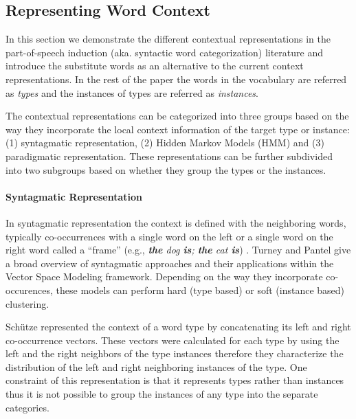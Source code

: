 \subsection{Representing Word Context}
\label{sec:representation}


In this section we demonstrate the different contextual representations in the
part-of-speech induction (aka. syntactic word categorization) literature and
introduce the substitute words as an alternative to the current context
representations.  In the rest of the paper the words in the vocabulary are
referred as {\em types} and the instances of types are referred as {\em
instances}.

The contextual representations can be categorized into three groups
based on the way they incorporate the local context information of the
target type or instance: (1) syntagmatic representation, (2) Hidden
Markov Models (HMM) and (3) paradigmatic representation.  These
representations can be further subdivided into two subgroups based on
whether they group the types or the instances.

\paragraph{Syntagmatic Representation}

In syntagmatic representation the context is defined with the
neighboring words, typically co-occurrences with a single word on the
left or a single word on the right word called a ``frame'' (e.g., {\em
  {\bf the} dog {\bf is}; {\bf the} cat {\bf is}})
\cite{SchutzePe93,redington1998distributional,mintz2003frequent,20674613,lamar-EtAl:2010:Short,maron2010sphere}.
Turney and Pantel  give a
broad overview of syntagmatic approaches and their applications within
the Vector Space Modeling framework.  Depending on the way they
incorporate co-occurences, these models can perform hard (type based)
or soft (instance based) clustering.

Sch\"{u}tze  represented the context of a word
type by concatenating its left and right co-occurrence vectors.  These
vectors were calculated for each type by using the left and the right
neighbors of the type instances therefore they characterize the
distribution of the left and right neighboring instances of the type.
One constraint of this representation is that it represents types
rather than instances thus it is not possible to group the instances of
any type into the separate categories.

